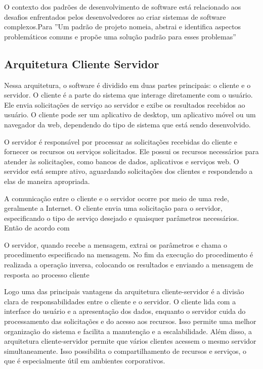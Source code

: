 O contexto dos padrões de desenvolvimento de software está relacionado aos desafios enfrentados pelos desenvolvedores ao criar sistemas de software complexos.Para \cite{padroesProjeto} ''Um padrão de projeto nomeia, abstrai e identifica aspectos problemáticos comuns e propõe uma solução padrão para esses problemas''


\subsection{Arquitetura Cliente Servidor}
Nessa arquitetura, o software é dividido em duas partes principais: o cliente e o servidor.
O cliente é a parte do sistema que interage diretamente com o usuário. Ele envia solicitações de serviço ao servidor e exibe os resultados recebidos ao usuário. O cliente pode ser um aplicativo de desktop, um aplicativo móvel ou um navegador da web, dependendo do tipo de sistema que está sendo desenvolvido.\cite{flanagan2012javascript}

O servidor é responsável por processar as solicitações recebidas do cliente e fornecer os recursos ou serviços solicitados. Ele possui os recursos necessários para atender às solicitações, como bancos de dados, aplicativos e serviços web. O servidor está sempre ativo, aguardando solicitações dos clientes e respondendo a elas de maneira apropriada.\cite{arqClientServer2}

A comunicação entre o cliente e o servidor ocorre por meio de uma rede, geralmente a Internet. O cliente envia uma solicitação para o servidor, especificando o tipo de serviço desejado e quaisquer parâmetros necessários.
Então de acordo com 
\begin{citacao}
	\cite{arqClientServer2} 
O servidor, quando recebe a mensagem, extrai os parâmetros 
e chama o procedimento especificado na mensagem. No fim da execução do procedimento é 
realizada a operação inversa, colocando os resultados e enviando a mensagem de resposta ao 
processo cliente
\end{citacao}

    Logo uma das principais vantagens da arquitetura cliente-servidor é a divisão clara de responsabilidades entre o cliente e o servidor. 
O cliente lida com a interface do usuário e a apresentação dos dados, enquanto o servidor cuida do processamento das solicitações e do acesso aos recursos. Isso permite uma melhor organização do sistema e facilita a manutenção e a escalabilidade.
Além disso, a arquitetura cliente-servidor permite que vários clientes acessem o mesmo servidor simultaneamente. Isso possibilita o compartilhamento de recursos e serviços, o que é especialmente útil em ambientes corporativos.\cite{arqClientServer2}

